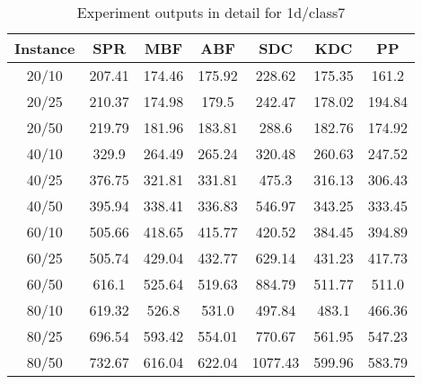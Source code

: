 \begin{table}[ht!]
    \caption{Experiment outputs in detail for 1d/class7}
    \centering
    \begin{tabular}{@{}ccccccc@{}}
        \toprule
        {\bfseries Instance} & {\bfseries SPR} & {\bfseries MBF}
        & {\bfseries ABF} & {\bfseries SDC} & {\bfseries KDC} & {\bfseries PP}\\
        \midrule
        20/10 & 207.41 & 174.46 & 175.92 & 228.62 & 175.35 & 161.2\\
        20/25 & 210.37 & 174.98 & 179.5 & 242.47 & 178.02 & 194.84\\
        20/50 & 219.79 & 181.96 & 183.81 & 288.6 & 182.76 & 174.92\\
        40/10 & 329.9 & 264.49 & 265.24 & 320.48 & 260.63 & 247.52\\
        40/25 & 376.75 & 321.81 & 331.81 & 475.3 & 316.13 & 306.43\\
        40/50 & 395.94 & 338.41 & 336.83 & 546.97 & 343.25 & 333.45\\
        60/10 & 505.66 & 418.65 & 415.77 & 420.52 & 384.45 & 394.89\\
        60/25 & 505.74 & 429.04 & 432.77 & 629.14 & 431.23 & 417.73\\
        60/50 & 616.1 & 525.64 & 519.63 & 884.79 & 511.77 & 511.0\\
        80/10 & 619.32 & 526.8 & 531.0 & 497.84 & 483.1 & 466.36\\
        80/25 & 696.54 & 593.42 & 554.01 & 770.67 & 561.95 & 547.23\\
        80/50 & 732.67 & 616.04 & 622.04 & 1077.43 & 599.96 & 583.79\\
        \bottomrule
    \end{tabular}
\end{table}